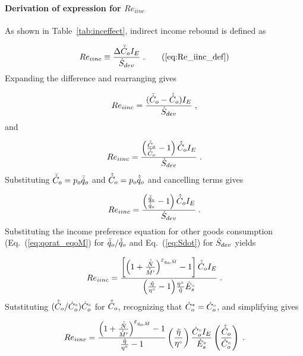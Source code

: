 \paragraph{Derivation of expression for $Re_{iinc}$}
\label{sec:Re_iinc}

As shown in Table~\ref{tab:inceffect}, indirect income rebound is defined as

\begin{equation}
  Re_{iinc} \equiv \frac{\Delta \rainc{C}_o I_E}{\Sdot} \; . \tag{\ref{eq:Re_iinc_def}}
\end{equation}
%
Expanding the difference and rearranging gives

\begin{equation}
  Re_{iinc} = \frac{(\bar{\dot{C}}_o - \hat{\dot{C}}_o) I_E}{\dot{S}_{dev}} \; , 
\end{equation}
%
and

\begin{equation}
  Re_{iinc} = \frac{\left( \frac{\bar{\dot{C}}_o}{\hat{\dot{C}}_o} - 1  \right) \hat{\dot{C}}_o I_E}{\dot{S}_{dev}} \; .
\end{equation}
%
Substituting $\bar{\dot{C}}_o = p_o \bar{\dot{q}}_o$ and $\hat{\dot{C}}_o = p_o \hat{\dot{q}}_o$ and
cancelling terms gives

\begin{equation}
  Re_{iinc} = \frac{\left( \frac{\bar{\dot{q}}_o}{\hat{\dot{q}}_o} - 1  \right) \hat{\dot{C}}_o I_E}{\dot{S}_{dev}} \; .
\end{equation}
%
Substituting the income preference equation for other goods consumption (Eq.~(\ref{eq:qorat_eqoM}) 
for $\bar{\dot{q}}_o / \hat{\dot{q}}_o$
and Eq.~(\ref{eq:Sdot}) for $\dot{S}_{dev}$ yields

\begin{equation}
  Re_{iinc} = \frac{\left[ \left( 1 + \frac{\hat{\dot{N}}}{\hat{\dot{M}}^\prime} \right)^{\varepsilon_{\dot{q}_o\!,\dot{M}}} - 1  \right] 
              \hat{\dot{C}}_o I_E}{\left( \frac{\tilde{\eta}}{{}{\eta}^{\scriptscriptstyle \circ}} - 1 \right)\! \frac{{}{\eta}^{\scriptscriptstyle \circ}}{\tilde{\eta}} {}{\dot{E}}^{\scriptscriptstyle \circ}_s} \; .
\end{equation}
%
Sutstituting $(\hat{\dot{C}}_o/{}{\dot{C}}^{\scriptscriptstyle \circ}_o) {}{\dot{C}}^{\scriptscriptstyle \circ}_o$ for $\hat{\dot{C}}_o$,  
recognizing that ${\dot{C}}^*_o = {}{\dot{C}}^{\scriptscriptstyle \circ}_o$, and simplifying gives 

\begin{equation}
  Re_{iinc} = \frac{\left( 1 + \frac{\hat{\dot{N}}}{\hat{\dot{M}}^\prime} \right)^{\varepsilon_{\dot{q}_o\!,\dot{M}}} - 1}{\frac{\tilde{\eta}}{{}{\eta}^{\scriptscriptstyle \circ}} - 1} 
              \left( \frac{\tilde{\eta}}{{}{\eta}^{\scriptscriptstyle \circ}} \right)
              \frac{{}{\dot{C}}^{\scriptscriptstyle \circ}_o I_E}{{}{\dot{E}}^{\scriptscriptstyle \circ}_s}
              \left( \frac{\hat{\dot{C}}_o}{{}{\dot{C}}^{\scriptscriptstyle \circ}_o} \right) \; .
\end{equation}

